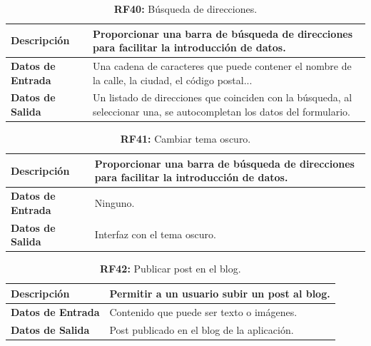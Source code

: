 \documentclass[a4paper, 12pt]{article}
\begin{document}
\begin{table}[H]
\captionsetup{list=no}%
\captionsetup{justification=raggedright,singlelinecheck=false}
\captionsetup{labelformat=empty}
\caption{\textbf{RF40:} Búsqueda de direcciones.}
\label{tab:RF40}
	\begin{tabular}{|m{5cm}|m{10cm}|}
	\hline
	\textbf{Descripción} & Proporcionar una barra de búsqueda de direcciones para facilitar la introducción de datos. \\ 
	\hline
	\textbf{Datos de Entrada} & Una cadena de caracteres que puede contener el nombre de la calle, la ciudad, el código postal... \\ 
	\hline
	\textbf{Datos de Salida} & Un listado de direcciones que coinciden con la búsqueda, al seleccionar una, se autocompletan los datos del formulario. \\ 
	\hline
\end{tabular}
\end{table}

\begin{table}[H]
\captionsetup{list=no}%
\captionsetup{justification=raggedright,singlelinecheck=false}
\captionsetup{labelformat=empty}
\caption{\textbf{RF41:} Cambiar tema oscuro.}
\label{tab:RF41}
	\begin{tabular}{|m{5cm}|m{10cm}|}
	\hline
	\textbf{Descripción} & Proporcionar una barra de búsqueda de direcciones para facilitar la introducción de datos. \\ 
	\hline
	\textbf{Datos de Entrada} & Ninguno.\\ 
	\hline
	\textbf{Datos de Salida} & Interfaz con el tema oscuro.  \\ 
	\hline
\end{tabular}
\end{table}

\begin{table}[H]
\captionsetup{list=no}%
\captionsetup{justification=raggedright,singlelinecheck=false}
\captionsetup{labelformat=empty}
\caption{\textbf{RF42:} Publicar post en el blog.}
\label{tab:RF42}
	\begin{tabular}{|m{5cm}|m{10cm}|}
	\hline
	\textbf{Descripción} & Permitir a un usuario subir un post al blog. \\ 
	\hline
	\textbf{Datos de Entrada} & Contenido que puede ser texto o imágenes. \\ 
	\hline
	\textbf{Datos de Salida} & Post publicado en el blog de la aplicación. \\ 
	\hline
\end{tabular}
\end{table}
\end{document}
